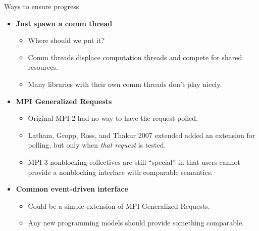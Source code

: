 \documentclass{beamer}
\begin{document}
\begin{frame}{Ways to ensure progress}
  \begin{itemize}
  \item{\bf Just spawn a comm thread}
    \begin{itemize}
    \item Where should we put it?
    \item Comm threads displace computation threads and compete for shared resources.
    \item Many libraries with their own comm threads don't play nicely.
    \end{itemize}
  \item{\bf MPI Generalized Requests}
    \begin{itemize}
    \item Original MPI-2 had no way to have the request polled.
    \item Latham, Gropp, Ross, and Thakur 2007 extended added an extension for polling, but only when \emph{that request} is tested.
    \item MPI-3 nonblocking collectives are still ``special'' in that users cannot provide a nonblocking interface with comparable semantics.
    \end{itemize}
  \item{\bf Common event-driven interface}
    \begin{itemize}
    \item Could be a simple extension of MPI Generalized Requests.
    \item Any new programming models should provide something comparable.
    \end{itemize}
  \end{itemize}
\end{frame}
\end{document}
